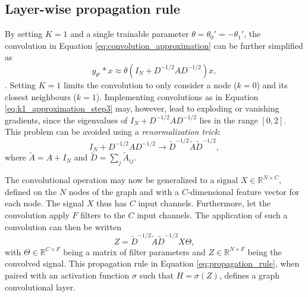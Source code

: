 \subsection{Layer-wise propagation rule}
By setting $K = 1$ and a single trainable parameter $\theta = \theta_0' = -\theta_1'$, the convolution in Equation \eqref{eq:convolution_approximation} can be further simplified as 
\begin{equation}
    g_{\theta'} * x \approx \theta \left(I_N + D^{-1/2}AD^{-1/2} \right)x,
    \label{eq:k1_approximation_step3}
\end{equation}
\cite{kipf_semi_supervised}. Setting $K=1$ limits the convolution to only consider a node ($k=0$) and its closest neighbours ($k=1$). Implementing convolutions as in Equation \eqref{eq:k1_approximation_step3} may, however, lead to exploding or vanishing gradients, since the eigenvalues of $I_N + D^{-1/2}AD^{-1/2}$ lies in the range $[0, 2]$. This problem can be avoided using a \textit{renormalization trick}:
\begin{equation}
    I_N + D^{-1/2}AD^{-1/2} \rightarrow \tilde{D}^{-1/2} \tilde{A} \tilde{D}^{-1/2},
    \label{eq:renormalization_trick}
\end{equation}
where $\tilde{A} = A + I_N$ and $\tilde{D} = \sum_j \tilde{A}_{ij}$.

The convolutional operation may now be generalized to a signal $X \in \mathbb{R}^{N \times C}$, defined on the $N$ nodes of the graph and with a $C$-dimensional feature vector for each node. The signal $X$ thus has $C$ input channels. Furthermore, let the convolution apply $F$ filters to the $C$ input channels. The application of such a convolution can then be written
\begin{equation}
    Z = \tilde{D}^{-1/2} \tilde{A} \tilde{D}^{-1/2} X \Theta,
    \label{eq:propagation_rule}
\end{equation}
with $\Theta \in \mathbb{R}^{C\times F}$ being a matrix of filter parameters and $Z \in \mathbb{R}^{N\times F}$ being the convolved signal. This propagation rule in Equation \eqref{eq:propagation_rule}, when paired with an activation function $\sigma$ such that $H = \sigma\left(Z \right)$, defines a graph convolutional layer. 

